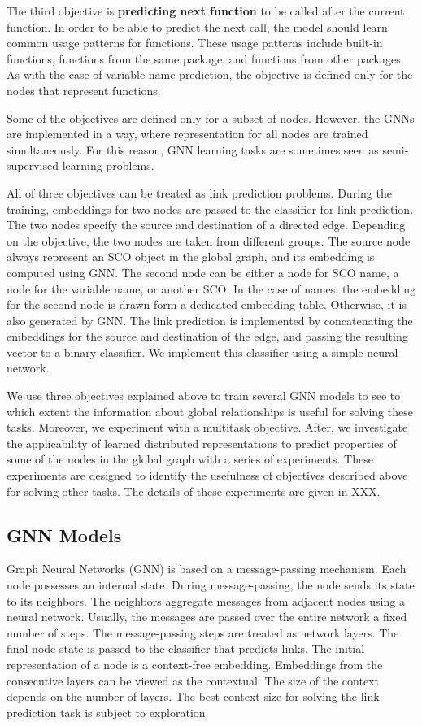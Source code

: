 \documentclass[a4paper,twoside]{article}
\begin{document}
The third objective is \textbf{predicting next function} to be called after the current function. In order to be able to predict the next call, the model should learn common usage patterns for functions. These usage patterns include built-in functions, functions from the same package, and functions from other packages. As with the case of variable name prediction, the objective is defined only for the nodes that represent functions. 

Some of the objectives are defined only for a subset of nodes. However, the GNNs are implemented in a way, where representation for all nodes are trained simultaneously. For this reason, GNN learning tasks are sometimes seen as semi-supervised learning problems.

All of three objectives can be treated as link prediction problems. During the training, embeddings for two nodes are passed to the classifier for link prediction. The two nodes specify the source and destination of a directed edge. Depending on the objective, the two nodes are taken from different groups. The source node always represent an SCO object in the global graph, and its embedding is computed using GNN\@. The second node can be either a node for SCO name, a node for the variable name, or another SCO\@. In the case of names, the embedding for the second node is drawn form a dedicated embedding table. Otherwise, it is also generated by GNN\@. The link prediction is implemented by concatenating the embeddings for the source and destination of the edge, and passing the resulting vector to a binary classifier. We implement this classifier using a simple neural network.

We use three objectives explained above to train several GNN models to see to which extent the information about global relationships is useful for solving these tasks. Moreover, we experiment with a multitask objective. After, we investigate the applicability of learned distributed representations to predict properties of some of the nodes in the global graph with a series of experiments. These experiments are designed to identify the usefulness of objectives described above for solving other tasks. The details of these experiments are given in XXX.

\subsection{GNN Models}

Graph Neural Networks (GNN) is based on a message-passing mechanism. Each node possesses an internal state. During message-passing, the node sends its state to its neighbors. The neighbors aggregate messages from adjacent nodes using a neural network. Usually, the messages are passed over the entire network a fixed number of steps. The message-passing steps are treated as network layers. The final node state is passed to the classifier that predicts links. The initial representation of a node is a context-free embedding. Embeddings from the consecutive layers can be viewed as the contextual. The size of the context depends on the number of layers. The best context size for solving the link prediction task is subject to exploration.
\end{document}
